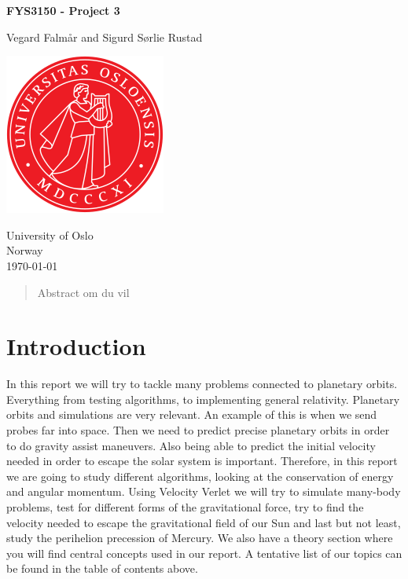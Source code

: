 \documentclass[reprint, english,notitlepage,nofootinbib]{revtex4-1}  %
\begin{document}
\begin{titlepage}
	\begin{center}
	\textbf{FYS3150 - Project 3}

	\vspace{0.2cm}
	Vegard Falmår and Sigurd Sørlie Rustad

	\vspace{0.5cm}
	\includegraphics[scale=0.5]{UIO}
	\vspace{0.8cm}

	University of Oslo\\
	Norway\\
	\today	\\
	\end{center}
	\tableofcontents
	\clearpage
\end{titlepage}

\begin{abstract}
Abstract om du vil
\end{abstract}
\maketitle                              %


\section{Introduction}

In this report we will try to tackle many problems connected to planetary orbits. Everything from testing algorithms, to implementing general relativity. Planetary orbits and simulations are very relevant. An example of this is when we send probes far into space. Then we need to predict precise planetary orbits in order to do gravity assist maneuvers. Also being able to predict the initial velocity needed in order to escape the solar system is important. Therefore, in this report we are going to study different algorithms, looking at the conservation of energy and angular momentum. Using Velocity Verlet we will try to simulate many-body problems, test for different forms of the gravitational force, try to find the velocity needed to escape the gravitational field of our Sun and last but not least, study the perihelion precession of Mercury. We also have a theory section where you will find central concepts used in our report. A tentative list of our topics can be found in the table of contents above.
\end{document}
